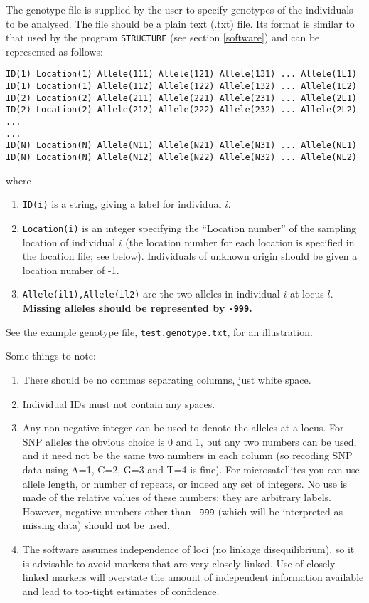 \documentclass[10pt,titlepage,times,letterpaper]{article}
\begin{document}
The genotype file is supplied by the user to specify genotypes of the
individuals to be analysed. The file should be a plain text (.txt) file.
Its format is similar to that
used by the program {\tt STRUCTURE} (see section \ref{software})
and can be represented as follows:

\begin{verbatim}
ID(1) Location(1) Allele(111) Allele(121) Allele(131) ... Allele(1L1)
ID(1) Location(1) Allele(112) Allele(122) Allele(132) ... Allele(1L2)
ID(2) Location(2) Allele(211) Allele(221) Allele(231) ... Allele(2L1)
ID(2) Location(2) Allele(212) Allele(222) Allele(232) ... Allele(2L2)
...
...
ID(N) Location(N) Allele(N11) Allele(N21) Allele(N31) ... Allele(NL1)
ID(N) Location(N) Allele(N12) Allele(N22) Allele(N32) ... Allele(NL2)
\end{verbatim}
where
\begin{enumerate}
\item{\tt ID(i)} is a string, giving a label for individual $i$.
\item{\tt Location(i)} is an integer specifying the ``Location number'' of
the sampling location
of individual $i$ (the location number for each location 
is specified in the location file; see below). Individuals of unknown
origin should be given a location number of -1.
\item{{\tt Allele(il1),Allele(il2)}} are the two alleles in
individual $i$ at locus $l$. {\bf Missing alleles should
be represented by {\tt -999}.}
\end{enumerate}
See the example genotype file, {\tt test.genotype.txt}, for an illustration.

Some things to note:
\begin{enumerate}
\item There should be no commas separating columns, just white space.
\item Individual IDs must not contain any spaces.
\item Any non-negative integer can be used to denote the alleles at a locus.
For SNP alleles the obvious choice is 0 and 1, but any two numbers can be used,
and it need not be the same two numbers in each column (so recoding SNP data 
using A=1, C=2, G=3 and T=4 is fine).  For microsatellites you can use 
allele length, or number of repeats, or indeed any set of integers.  No use 
is made of the relative values of these numbers; they are arbitrary labels.
However, negative numbers other than {\tt -999} (which will be interpreted as
missing data) should not be used.
\item The software assumes independence of loci (no linkage disequilibrium),
so it is advisable to avoid markers that are very closely linked. 
Use of closely linked markers will overstate the amount of independent 
information available and lead to too-tight estimates of confidence.
\end{enumerate}
\end{document}
